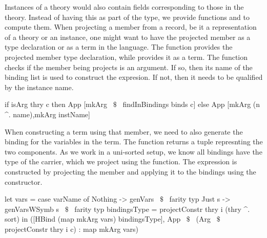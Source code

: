 Instances of a theory would also contain fields corresponding to those in the theory. Instead of having this as part of the type, we provide functions  and  to compute them. 
When projecting a member from a record, be it a representation of a theory or an instance, one might want to have the projected member as a type declaration or as a term in the language. The function  provides the projected member type declaration, while  provides it as a term. 
The  function checks if the member being projects is an argument. If so, then its name of the binding list is used to construct the expresion. If not, then it needs to be qualified by the instance name. 
\begin{hscode} 
 if isArg thry c then App [mkArg ~$\$$~ findInBindings binds c]
 else App [mkArg (n ^. name),mkArg instName]
\end{hscode} 
When constructing a term using that member, we need to also generate the binding for the variables in the term. The function  returns a tuple  represnting the two components. As we work in a uni-sorted setup, we know all bindings have the type of the carrier, which we project using the  function. The expression is constructed by projecting the member and applying it to the bindings using the  constructor. 
\begin{hscode} 
let vars = case varName of
       Nothing -> genVars ~$\$$~ farity typ
       Just s -> genVarsWSymb s ~$\$$~ farity typ
     bindingsType = projectConstr thry i (thry ^. sort) 
in  ([HBind (map mkArg vars) bindingsType],
      App ~$\$$~ (Arg ~$\$$~ projectConstr thry i c) : map mkArg vars) 
\end{hscode} 


